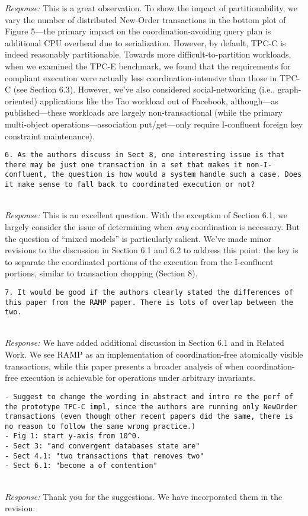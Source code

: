 \documentclass[10pt]{article}
\newcommand{\reviewer}[1] {\noindent\colorbox{reviewercolor}{\parbox{\textwidth}{\noindent\texttt{#1}}}\\}
\newcommand{\response}[1] {\noindent\textit{Response: } #1\\}
\begin{document}
\response{This is a great observation. To show the impact of
  partitionability, we vary the number of distributed New-Order
  transactions in the bottom plot of Figure 5---the primary impact on
  the coordination-avoiding query plan is additional CPU overhead due
  to serialization. However, by default, TPC-C is indeed reasonably
  partitionable. Towards more difficult-to-partition workloads, when
  we examined the TPC-E benchmark, we found that the requirements for
  compliant execution were actually less coordination-intensive than
  those in TPC-C (see Section 6.3). However, we've also considered
  social-networking (i.e., graph-oriented) applications like the Tao workload out of
  Facebook, although---as published---these workloads are largely
  non-transactional (while the primary multi-object
  operations---association put/get---only require I-confluent foreign key
  constraint maintenance).}

\reviewer{6. As the authors discuss in Sect 8, one interesting issue is that there may be just one transaction in a set that makes it non-I-confluent, the question is how would a system handle such a case. Does it make sense to fall back to coordinated execution or not? }

\response{This is an excellent question. With the exception of Section
  6.1, we largely consider the issue of determining when \textit{any}
  coordination is necessary. But the question of ``mixed models'' is
  particularly salient. We've made minor revisions to the discussion
  in Section 6.1 and 6.2 to address this point: the key is to separate
  the coordinated portions of the execution from the I-confluent
  portions, similar to transaction chopping (Section 8).}

\reviewer{7. It would be good if the authors clearly stated the differences of this paper from the RAMP paper. There is lots of overlap between the two. }

\response{We have added additional discussion in Section 6.1 and in Related Work. We see
  RAMP as an implementation of coordination-free atomically visible
  transactions, while this paper presents a broader analysis of when
  coordination-free execution is achievable for operations under arbitrary invariants.}

\reviewer{- Suggest to change the wording in abstract and intro re the
  perf of the prototype TPC-C impl, since the authors are running only
  NewOrder transactions (even though other recent papers did the same,
  there is no reason to follow the same wrong practice.)\\
- Fig 1: start y-axis from 10\^{}0. \\
- Sect 3: "and convergent databases state are"\\
- Sect 4.1: "two transactions that removes two"\\
- Sect 6.1: "become a of contention"}

\response{Thank you for the suggestions. We have incorporated them in the revision.}
\end{document}
